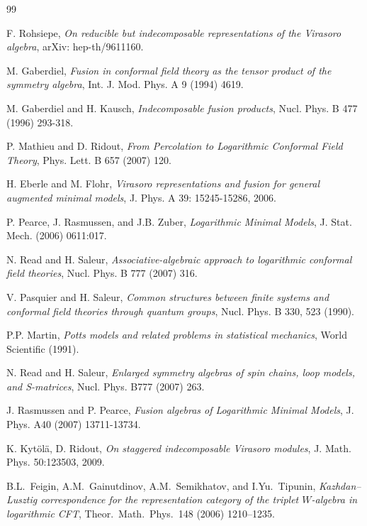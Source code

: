 \documentclass[11pt]{article}
\theoremstyle{definition}
\begin{document}
\begin{thebibliography}{99}

F. Rohsiepe, \textit{On reducible but indecomposable representations of the Virasoro algebra}, arXiv: hep-th/9611160.

M. Gaberdiel, \textit{Fusion in conformal field theory as the tensor product of the symmetry algebra},
Int. J. Mod. Phys. A 9 (1994) 4619.

 M. Gaberdiel and H. Kausch, \textit{Indecomposable fusion
  products}, Nucl. Phys. B 477 (1996) 293-318.

 P. Mathieu and D. Ridout,  \textit{From Percolation to
  Logarithmic Conformal Field Theory},  Phys. Lett. B 657 (2007) 120.

 H. Eberle and M. Flohr, \textit{Virasoro representations and fusion for general augmented minimal models}, J. Phys. A 39: 15245-15286, 2006.

 P. Pearce, J. Rasmussen, and J.B. Zuber,
  \textit{Logarithmic Minimal Models}, J. Stat. Mech. (2006) 0611:017.

 N. Read and H. Saleur, \textit{Associative-algebraic approach to logarithmic conformal field theories}, Nucl. Phys. B 777 (2007) 316.

 V. Pasquier and H. Saleur, \textit{Common structures
  between finite systems and conformal field theories through quantum
  groups}, Nucl. Phys. B 330, 523 (1990).

 P.P. Martin, \textit{Potts models and related problems in statistical mechanics}, World Scientific (1991).

 N. Read and H. Saleur,  \textit{Enlarged symmetry algebras of spin chains,
  loop models, and S-matrices}, Nucl. Phys. B777 (2007) 263.

      J. Rasmussen and P. Pearce, \textit{Fusion algebras of
  Logarithmic Minimal Models}, J. Phys. A40 (2007) 13711-13734.

 K. Kyt\"ol\"a, D. Ridout, \textit{On staggered indecomposable Virasoro modules},
J. Math. Phys. 50:123503, 2009.

\bibitem{[FGST2]} B.L.~Feigin, A.M.~Gainutdinov, A.M.~Semikhatov, and
  I.Yu.~Tipunin, \textit{Kazhdan--Lusztig correspondence for the
    representation category of the triplet $W$-algebra in logarithmic
    CFT}, Theor.\ Math.\ Phys.\ 148 (2006) 1210--1235.


\end{thebibliography}
\end{document}

